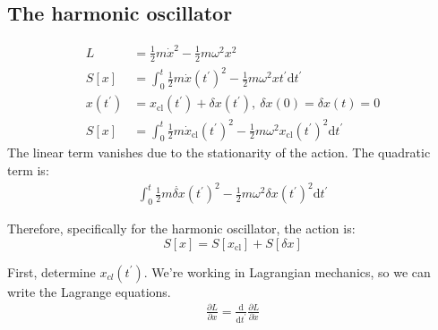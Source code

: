 \documentclass[a4paper]{extarticle}
\newcommand{\tpr}{t^\prime}
\newcommand{\dtpr}{\text{d}t^\prime}
\newcommand{\ddtpr}{\frac{\text{d}}{\text{d}t^\prime}}
\begin{document}
\subsection{The harmonic oscillator}

\begin{align*}
  L                  & = \frac{1}{2}m\dot{x}^2 - \frac{1}{2}m\omega^2 x^2
  \\
  S\left[ x \right]  & =
  \int_{0}^{t} \frac{1}{2}m\dot{x}(\tpr)^2 - \frac{1}{2}m\omega^2 x\tpr \dtpr
  \\
  x(\tpr)            & = x_{\text{cl}}(\tpr) + \delta x(\tpr),\ \delta x(0) = \delta x(t) =
  0
  \\
  S \left[ x \right] & = \int_{0}^{t}
  \frac{1}{2}m\dot{x}_{\text{cl}}(\tpr)^2 - \frac{1}{2}m\omega^2
  x_{\text{cl}}(\tpr)^2 \dtpr
\end{align*}
The linear term vanishes due to the
stationarity of the action.
The quadratic term is:
\begin{align*}
  \int_{0}^{t} \frac{1}{2}m\dot{\delta x}(\tpr)^2 - \frac{1}{2}m\omega^2 \delta x(\tpr)^2 \dtpr
\end{align*}

Therefore, specifically for the harmonic oscillator, the action is: $$
  S\left[x\right] = S\left[x_{\text{cl}}\right] + S\left[\delta x\right] $$

First, determine $x_{cl}(\tpr)$.
We're working in Lagrangian mechanics, so we can write the Lagrange equations.
\begin{align*}
  \frac{\partial L}{\partial x} = \ddtpr \frac{\partial L}{\partial\dot{x}}
\end{align*}
\end{document}
